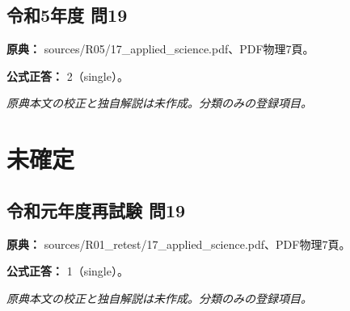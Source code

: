 \subsection{令和5年度 問19}
\label{q:r05-reg-applied-19}

\noindent\textbf{原典：} sources/R05/17\_applied\_science.pdf、PDF物理7頁。

\textbf{公式正答：} 2（single）。

\par\textit{原典本文の校正と独自解説は未作成。分類のみの登録項目。}

\section{未確定}

\subsection{令和元年度再試験 問19}
\label{q:r01-ret-applied-19}

\noindent\textbf{原典：} sources/R01\_retest/17\_applied\_science.pdf、PDF物理7頁。

\textbf{公式正答：} 1（single）。

\par\textit{原典本文の校正と独自解説は未作成。分類のみの登録項目。}

